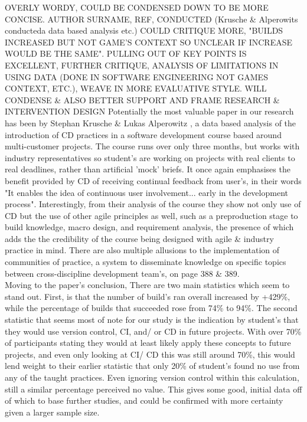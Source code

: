 \documentclass[journal]{IEEEtran}
\begin{document}
OVERLY WORDY, COULD BE CONDENSED DOWN TO BE MORE CONCISE. AUTHOR SURNAME, REF, CONDUCTED (Krusche \& Alperowits \cite{CDCourse2014} conducteda data based analysis etc.) COULD CRITIQUE MORE, "BUILDS INCREASED BUT NOT GAME'S CONTEXT SO UNCLEAR IF INCREASE WOULD BE THE SAME". PULLING OUT OF KEY POINTS IS EXCELLENT, FURTHER CRITIQUE, ANALYSIS OF LIMITATIONS IN USING DATA (DONE IN SOFTWARE ENGINEERING NOT GAMES CONTEXT, ETC.), WEAVE IN MORE EVALUATIVE STYLE. WILL CONDENSE \& ALSO BETTER SUPPORT AND FRAME RESEARCH \& INTERVENTION DESIGN Potentially the most valuable paper in our research has been by Stephan Krusche \& Lukas Alperowitz \cite{CDCourse2014}, a data based analysis of the introduction of CD practices in a software development course based around multi-customer projects. The course runs over only three months, but works with industry representatives so student's are working on projects with real clients to real deadlines, rather than artificial 'mock' briefs. It once again emphasises the benefit provided by CD of receiving continual feedback from user's, in their words "It enables the idea of continuous user involvement... early in the development process"\cite[p.338]{CDCourse2014}. Interestingly, from their analysis of the course they show not only use of CD but the use of other agile principles as well, such as a preproduction stage to build knowledge\cite[p.338]{CDCourse2014}, macro design\cite[timestamp 28:20]{caernymethod}, and requirement analysis, the presence of which adds the the credibility of the course being designed with agile \& industry practice in mind. There are also multiple allusions to the implementation of communities of practice\cite{agilewithscrum}, a system to disseminate knowledge on specific topics between cross-discipline development team's, on page 388 \& 389. \\
Moving to the paper's conclusion, There are two main statistics which seem to stand out. First, is that the number of build's ran overall increased by +429\%\cite[p.342]{CDCourse2014}, while the percentage of builds that succeeded rose from 74\% to 94\%. The second statistic that seems most of note for our study is the indication by student's that they would use version control, CI, and/ or CD in future projects. With over 70\% of participants stating they would at least likely apply these concepts to future projects\cite[p.342]{CDCourse2014}, and even only looking at CI/ CD this was still around 70\%, this would lend weight to their earlier statistic that only 20\% of  student's found no use from any of the taught practices. Even ignoring version control within this calculation, still a similar percentage perceived no value. This gives some good, initial data off of which to base further studies, and could be confirmed with more certainty given a larger sample size.
\end{document}
